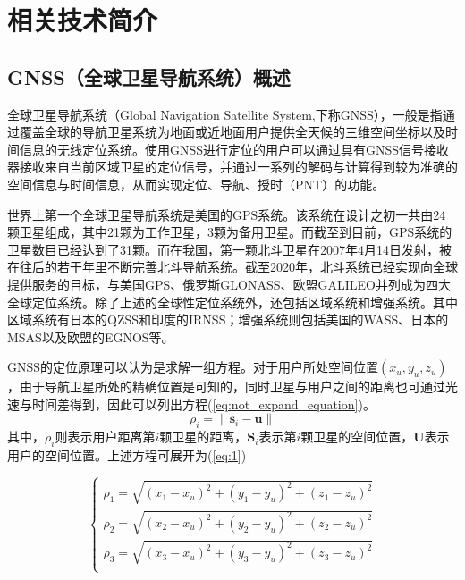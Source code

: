 \section{相关技术简介}

\subsection{GNSS（全球卫星导航系统）概述}
全球卫星导航系统（Global Navigation Satellite System,下称GNSS），一般是指通过覆盖全球的导航卫星系统为地面或近地面用户提供全天候的三维空间坐标以及时间信息的无线定位系统。使用GNSS进行定位的用户可以通过具有GNSS信号接收器接收来自当前区域卫星的定位信号，并通过一系列的解码与计算得到较为准确的空间信息与时间信息，从而实现定位、导航、授时（PNT）的功能。

世界上第一个全球卫星导航系统是美国的GPS系统。该系统在设计之初一共由24颗卫星组成，其中21颗为工作卫星，3颗为备用卫星。而截至到目前，GPS系统的卫星数目已经达到了31颗。而在我国，第一颗北斗卫星在2007年4月14日发射，被在往后的若干年里不断完善北斗导航系统。截至2020年，北斗系统已经实现向全球提供服务的目标，与美国GPS、俄罗斯GLONASS、欧盟GALILEO并列成为四大全球定位系统。除了上述的全球性定位系统外，还包括区域系统和增强系统。其中区域系统有日本的QZSS和印度的IRNSS；增强系统则包括美国的WASS、日本的MSAS以及欧盟的EGNOS等。

GNSS的定位原理可以认为是求解一组方程。对于用户所处空间位置$(x_u, y_u, z_u)$，由于导航卫星所处的精确位置是可知的，同时卫星与用户之间的距离也可通过光速与时间差得到，因此可以列出方程(\ref{eq:not_expand_equation})。
\begin{equation}
    \rho_i=\|\textbf{s}_i-\textbf{u}\|
    \label{eq:not_expand_equation}
\end{equation}
其中，$\rho_i$则表示用户距离第$i$颗卫星的距离，$\textbf{S}_i$表示第$i$颗卫星的空间位置，$\textbf{U}$表示用户的空间位置。上述方程可展开为(\ref{eq:1})

\begin{equation}
    \begin{cases}
        \rho_1=\sqrt{(x_1-x_u)^2+(y_1-y_u)^2+(z_1-z_u)^2}\\
        \rho_2=\sqrt{(x_2-x_u)^2+(y_2-y_u)^2+(z_2-z_u)^2}\\
        \rho_3=\sqrt{(x_3-x_u)^2+(y_3-y_u)^2+(z_3-z_u)^2}\\
    \end{cases}
    \label{eq:1}
\end{equation}

